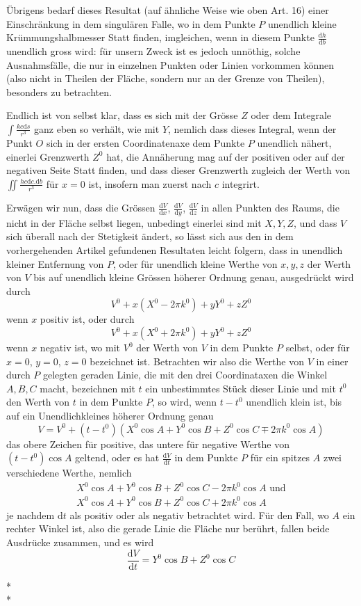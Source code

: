 Übrigens bedarf dieses Resultat (auf ähnliche Weise wie oben Art. 16) einer Einschränkung in dem singulären Falle, wo in dem Punkte $P$ unendlich kleine Krümmungshalbmesser Statt finden, imgleichen, wenn in diesem Punkte $\frac{\mathrm dh}{\mathrm db}$ unendlich gross wird: für unsern Zweck ist es jedoch unnöthig, solche Ausnahmsfälle, die nur in einzelnen Punkten oder Linien vorkommen können (also nicht in Theilen der Fläche, sondern nur an der Grenze von Theilen), besonders zu betrachten.

Endlich ist von selbst klar, dass es sich mit der Grösse $Z$ oder dem Integrale $\int\frac{kc\mathrm ds}{r^3}$ ganz eben so verhält, wie mit $Y$, nemlich dass dieses Integral, wenn der Punkt $O$ sich in der ersten Coordinatenaxe dem Punkte $P$ unendlich nähert, einerlei Grenzwerth $Z^0$ hat, die Annäherung mag auf der positiven oder auf der negativen Seite Statt finden, und dass dieser Grenzwerth zugleich der Werth von $\iint\frac{hc\mathrm dc.\mathrm db}{r^3}$ für $x=0$ ist, insofern man zuerst nach $c$ integrirt.

%
Erwägen wir nun, dass die Grössen $\frac{\mathrm dV}{\mathrm dx}$, $\frac{\mathrm dV}{\mathrm dy}$, $\frac{\mathrm dV}{\mathrm dz}$ in allen Punkten des Raums, die nicht in der Fläche selbst liegen, unbedingt einerlei sind mit $X,Y,Z$, und dass $V$ sich überall nach der Stetigkeit ändert, so lässt sich aus den in dem vorhergehenden Artikel gefundenen Resultaten leicht folgern, dass in unendlich kleiner Entfernung von $P$, oder für unendlich kleine Werthe von $x,y,z$ der Werth von $V$ bis auf unendlich kleine Grössen höherer Ordnung genau, ausgedrückt wird durch
\[
V^0+x(X^0-2\pi k^0)+yY^0+zZ^0
\]
wenn $x$ positiv ist, oder durch
\[
V^0+x(X^0+2\pi k^0)+yY^0+zZ^0
\]
wenn $x$ negativ ist, wo mit $V^0$ der Werth von $V$ in dem Punkte $P$ selbst, oder für $x=0$, $y=0$, $z=0$ bezeichnet ist. Betrachten wir also die Werthe von $V$ in einer durch $P$ gelegten geraden Linie, die mit den drei Coordinataxen die Winkel $A,B,C$ macht, bezeichnen mit $t$ ein unbestimmtes Stück dieser Linie und mit $t^0$ den Werth von $t$ in dem Punkte $P$, so wird, wenn $t-t^0$ unendlich klein ist, bis auf ein Unendlichkleines höherer Ordnung genau
\[
V=V^0+(t-t^0)(X^0\cos A+Y^0\cos B+Z^0\cos C\mp2\pi k^0\cos A)
\]
das obere Zeichen für positive, das untere für negative Werthe von $(t-t^0)\cos A$ geltend, oder es hat $\frac{\mathrm dV}{\mathrm dt}$ in dem Punkte $P$ für ein spitzes $A$ zwei verschiedene Werthe, nemlich
\[
\begin{gathered}
X^0\cos A+Y^0\cos B+Z^0\cos C-2\pi k^0\cos A\text{ und}\\
X^0\cos A+Y^0\cos B+Z^0\cos C+2\pi k^0\cos A
\end{gathered}
\]
je nachdem $\mathrm dt$ als positiv oder als negativ betrachtet wird. Für den Fall, wo $A$ ein rechter Winkel ist, also die gerade Linie die Fläche nur berührt, fallen beide Ausdrücke zusammen, und es wird
\[
\frac{\mathrm dV}{\mathrm dt}=Y^0\cos B+Z^0\cos C
\]
\begin{center}*\qquad\qquad*\\{}*\end{center}

